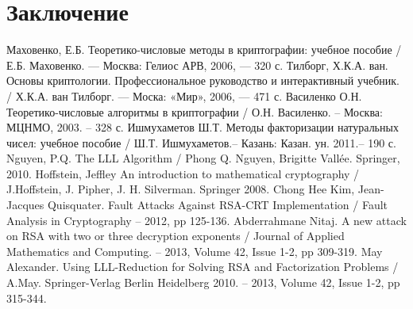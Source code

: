 \newpage
\chapter*{Заключение}


\newpage
{}
\begin{thebibliography}{}	
	  Маховенко, Е.Б. Теоретико-числовые методы в криптографии: учебное пособие / Е.Б. Маховенко. — Москва: Гелиос АРВ, 2006, — 320 с.
	  Тилборг, Х.К.А. ван. Основы криптологии. Профессиональное руководство и интерактивный учебник. / Х.К.А. ван Тилборг. — Моска: «Мир», 2006,
	  — 471 с.
	  Василенко О.Н. Теоретико-числовые алгоритмы в криптографии / О.Н. Василенко. – Москва: МЦНМО, 2003. – 328 с.
	  Ишмухаметов Ш.Т. Методы факторизации натуральных чисел: учебное пособие / Ш.Т. Ишмухаметов.– Казань: Казан. ун. 2011.– 190 с.
	  Nguyen, P.Q. The LLL Algorithm / Phong Q. Nguyen, Brigitte Vallée. Springer, 2010.
	  Hoffstein, Jeffley An introduction to mathematical cryptography / J.Hoffstein, J. Pipher, J. H. Silverman. Springer 2008.
	  Chong Hee Kim, Jean-Jacques Quisquater. Fault Attacks Against RSA-CRT Implementation / Fault Analysis in Cryptography – 2012, pp 125-136.
	  Abderrahmane Nitaj. A new attack on RSA with two or three decryption exponents / Journal of Applied Mathematics and Computing. –
	  2013, Volume 42, Issue 1-2, pp 309-319.	
	  May Alexander. Using LLL-Reduction for Solving RSA and Factorization Problems / A.May. Springer-Verlag Berlin Heidelberg 2010. –
	  2013, Volume 42, Issue 1-2, pp 315-344.	
\end{thebibliography}
